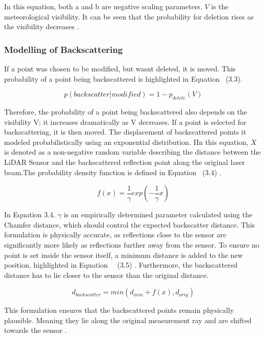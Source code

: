 In this equation, both a and b are negative scaling parameters. $V$ is the meteorological visibility. It can be seen that the probability for deletion rises as the visibility decreases \cite{teufel_simulating_2022}. 

\subsubsection{Modelling of Backscattering}
If a point was chosen to be modified, but wasnt deleted, it is moved. This probability of a point being backscattered is highlighted in Equation ~(3.3). 

\begin{equation}
    p(backscatter | modified) =  1- p_{delete}(V)
\end{equation}

Therefore, the probability of a point being backscattered also depends on the visibility V; it increases dramatically as V decreases. 
If a point is selected for backscattering, it is then moved. The displacement of backscattered points it modeled probabilistically using an exponential distribution. IIn this equation, $X$ is denoted as a non-negative random variable describing the distance between the LiDAR Sensor and the backscattered reflection point along the original laser beam.The probability density function is defined in Equation ~(3.4) \cite{teufel_simulating_2022}.

\begin{equation}
    f(x) = \dfrac{1}{\gamma}exp(-\dfrac{1}{\gamma}x)
\end{equation}

In Equation 3.4. $\gamma$ is an empirically determined parameter calculated using the Chamfer distance, which should control the expected backscatter distance. This formulation is physically accurate, as reflections close to the sensor are significantly more likely as reflections further away from the sensor. To ensure no point is set inside the sensor itself, a minimum distance is added to the new position, highlighted in Equation~ ~(3.5) \cite{teufel_simulating_2022}. Furthermore, the backscattered distance has to lie closer to the sensor than the original distance. 

\begin{equation}
    d_{backscatter} = min(d_{min} + f(x), d_{orig}) 
\end{equation}

This formulation ensures that the backscattered points remain physically plausible. Meaning they lie along the original measurement ray \cite{find source highlighting this} and are shifted towards the sensor \cite{find source}.

